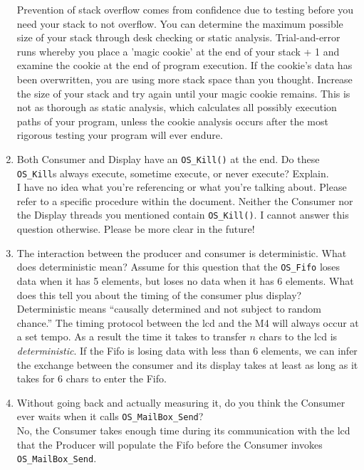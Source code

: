 \documentclass[12pt]{article}
\begin{document}
\begin{enumerate}[1)]
  Prevention of stack overflow comes from confidence due to testing
  before you need your stack to not overflow. You can determine the
  maximum possible size of your stack through desk checking or static
  analysis. Trial-and-error runs whereby you place a 'magic cookie' at
  the end of your stack + 1 and examine the cookie at the end of
  program execution. If the cookie's data has been overwritten, you
  are using more stack space than you thought. Increase the size of
  your stack and try again until your magic cookie remains. This is
  not as thorough as static analysis, which calculates all possibly
  execution paths of your program, unless the cookie analysis occurs
  after the most rigorous testing your program will ever endure.
\item Both Consumer and Display have an \verb|OS_Kill()| at the end. Do these
  \verb|OS_Kill|s always execute, sometime execute, or never execute?
  Explain. \\
  I have no idea what you're referencing or what you're talking
  about. Please refer to a specific procedure within the
  document. Neither the Consumer nor the Display threads you mentioned
  contain \verb|OS_Kill()|. I cannot answer this question otherwise. Please
  be more clear in the future!
\item The interaction between the producer and consumer is
  deterministic. What does deterministic mean? Assume for this
  question that the \verb|OS_Fifo| loses data when it has 5 elements, but
  loses no data when it has 6 elements. What does this tell you about
  the timing of the consumer plus display? \\
  Deterministic means ``causally determined and not subject to random
  chance.'' The timing protocol between the lcd and the M4 will always
  occur at a set tempo. As a result the time it takes to transfer $n$
  chars to the lcd is \emph{deterministic}. If the Fifo is losing data
  with less than 6 elements, we can infer the exchange between the
  consumer and its display takes at least as long as it takes for 6
  chars to enter the Fifo.
\item Without going back and actually measuring it, do you think the
  Consumer ever waits when it calls \verb|OS_MailBox_Send|? \\
  No, the Consumer takes enough time during its communication with the
  lcd that the Producer will populate the Fifo before the Consumer
  invokes \verb|OS_MailBox_Send|.
\end{enumerate}
\end{document}
